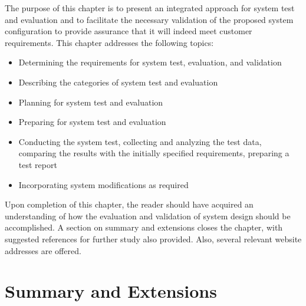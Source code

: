 The purpose of this chapter is to present an integrated approach for system test and evaluation and to facilitate the necessary validation of the proposed system configuration to provide assurance that it will indeed meet customer requirements. This chapter addresses the following topics:

\begin{itemize}
\item Determining the requirements for system test, evaluation, and validation
\item Describing the categories of system test and evaluation
\item Planning for system test and evaluation
\item Preparing for system test and evaluation
\item Conducting the system test, collecting and analyzing the test data, comparing the results with the initially specified requirements, preparing a test report
\item Incorporating system modifications as required
\end{itemize}

Upon completion of this chapter, the reader should have acquired an understanding of how the evaluation and validation of system design should be accomplished. A section on summary and extensions closes the chapter, with suggested references for further study also provided. Also, several relevant website addresses are offered.


\section{Summary and Extensions}


\begin{exercises}
    \begin{exercise}
    \label{sea-8-1}
    
    \end{exercise}
    \begin{solution}
    \end{solution}

\end{exercises}
